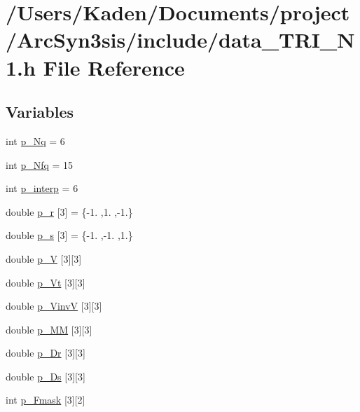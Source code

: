 \hypertarget{a00446}{}\section{/\+Users/\+Kaden/\+Documents/project/\+Arc\+Syn3sis/include/data\+\_\+\+T\+R\+I\+\_\+\+N1.h File Reference}
\label{a00446}
\subsection*{Variables}
\begin{DoxyCompactItemize}
\item 
int \hyperlink{a00446_a207fd9268dfef5bf1505928a4f4c774a}{p\+\_\+\+Nq} = 6
\item 
int \hyperlink{a00446_aa030b0a9fe619a48647119bacea600e0}{p\+\_\+\+Nfq} = 15
\item 
int \hyperlink{a00446_a240743866e0fdfc2ade414eedd98fde2}{p\+\_\+interp} = 6
\item 
double \hyperlink{a00446_a7e52da56416e11a4783c0aa859d6b478}{p\+\_\+r} \mbox{[}3\mbox{]} = \{-\/1. ,1. ,-\/1.\}
\item 
double \hyperlink{a00446_a4c959c774f208d54bee20ec721ff52fe}{p\+\_\+s} \mbox{[}3\mbox{]} = \{-\/1. ,-\/1. ,1.\}
\item 
double \hyperlink{a00446_a9a1b0b6d1a009b238af1cd0be11d7dd9}{p\+\_\+V} \mbox{[}3\mbox{]}\mbox{[}3\mbox{]}
\item 
double \hyperlink{a00446_a86cf67eade76e86bd82c6e60ce38d8bc}{p\+\_\+\+Vt} \mbox{[}3\mbox{]}\mbox{[}3\mbox{]}
\item 
double \hyperlink{a00446_a9ca678e47194c4e5ab792cd2e555593d}{p\+\_\+\+VinvV} \mbox{[}3\mbox{]}\mbox{[}3\mbox{]}
\item 
double \hyperlink{a00446_ac8ae9cb67334e33c4222bea485bf39fe}{p\+\_\+\+MM} \mbox{[}3\mbox{]}\mbox{[}3\mbox{]}
\item 
double \hyperlink{a00446_a718230132f9add142e28fd9078b7a818}{p\+\_\+\+Dr} \mbox{[}3\mbox{]}\mbox{[}3\mbox{]}
\item 
double \hyperlink{a00446_afe9c30056feb5271f416346c6ea6c40e}{p\+\_\+\+Ds} \mbox{[}3\mbox{]}\mbox{[}3\mbox{]}
\item 
int \hyperlink{a00446_a19c5c57b7dc71eb0fbdc015125cce46a}{p\+\_\+\+Fmask} \mbox{[}3\mbox{]}\mbox{[}2\mbox{]}

\end{DoxyCompactItemize}
